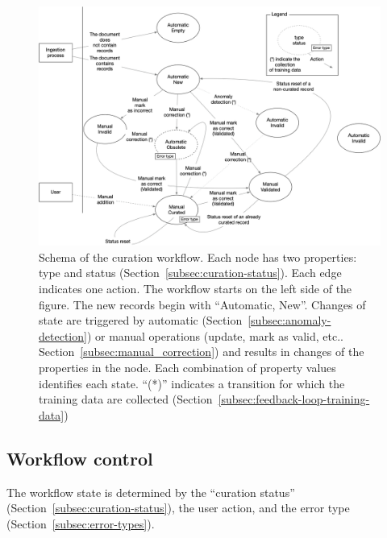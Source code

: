 \begin{figure}[ht]
  \centering
  \includegraphics[width=1\textwidth]{figures/curation/record-correction} 
  \caption{Schema of the curation workflow. Each node has two properties: type and status (Section~\ref{subsec:curation-status}). Each edge indicates one action. The workflow starts on the left side of the figure. The new records begin with ``Automatic, New''. Changes of state are triggered by automatic (Section~\ref{subsec:anomaly-detection}) or manual operations (update, mark as valid, etc.. Section~\ref{subsec:manual_correction}) and results in changes of the properties in the node. Each combination of property values identifies each state. ``(*)'' indicates a transition for which the training data are collected (Section~\ref{subsec:feedback-loop-training-data})}
  \label{fig:curation-workflow}
\end{figure}



\subsection{Workflow control}
\label{subsec:workflow-control}
The workflow state is determined by the ``curation status'' (Section~\ref{subsec:curation-status}), the user action, and the error type (Section~\ref{subsec:error-types}).

